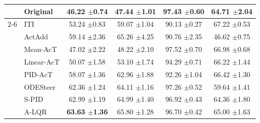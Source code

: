 \documentclass{article}
\theoremstyle{plain}
\theoremstyle{definition}
\theoremstyle{remark}
\begin{document}
\begin{table}[H]
\begin{threeparttable}
\begin{tabular}{ll|>{\columncolor{lightblue}}ccc|c}
    & Original & 46.22 {\tiny $\pm$0.74} & 47.44 {\tiny $\pm$1.01} & 97.43 {\tiny $\pm$0.60} & 64.71 {\tiny $\pm$2.04} \\
    \cmidrule(lr){2-6}
    \multirow{7}{*}{\rotatebox{90}{Llama-3-8B}} 
    & ITI & 53.24 {\tiny $\pm$0.83} & 59.07 {\tiny $\pm$1.04} & 90.13 {\tiny $\pm$0.27} & 67.22 {\tiny $\pm$0.53} \\
    & ActAdd & 59.14 {\tiny $\pm$2.36} & 65.26 {\tiny $\pm$4.25} & 90.76 {\tiny $\pm$2.35} & 46.62 {\tiny $\pm$0.75} \\
    & Mean-AcT & 47.02 {\tiny $\pm$2.22} & 48.22 {\tiny $\pm$2.10} & 97.52 {\tiny $\pm$0.70} & 66.98 {\tiny $\pm$0.68} \\
    & Linear-AcT & 50.07 {\tiny $\pm$1.58} & 53.10 {\tiny $\pm$1.74} & 94.29 {\tiny $\pm$0.71} & 66.22 {\tiny $\pm$1.44} \\
    & PID-AcT & 58.07 {\tiny $\pm$1.36} & 62.96 {\tiny $\pm$1.88} & 92.26 {\tiny $\pm$1.04} & 66.42 {\tiny $\pm$1.30}\\
    & ODESteer & 62.36 {\tiny $\pm$1.24} & 64.11 {\tiny $\pm$1.16} & 97.26 {\tiny $\pm$0.52} & 59.64 {\tiny $\pm$1.41} \\
    & S-PID &  62.99 {\tiny $\pm$1.19} & 64.99 {\tiny $\pm$1.40} & 96.92 {\tiny $\pm$0.43} & 64.36 {\tiny $\pm$1.80} \\
    & A-LQR &  \textbf{63.63 {\tiny $\pm$1.36}} & 65.80 {\tiny $\pm$1.28} & 96.70 {\tiny $\pm$0.42} & 65.00 {\tiny $\pm$1.63} \\


\end{tabular}
\end{threeparttable}
\end{table}
\end{document}
